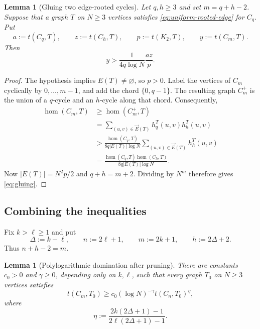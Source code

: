 \documentclass[11pt]{article}
\newtheorem{lemma}[theorem]{Lemma}
\theoremstyle{definition}
\theoremstyle{remark}
\newcommand{\homn}{\operatorname{hom}}
\begin{document}
\begin{lemma}[Gluing two edge-rooted cycles]
  \label{lem:gluing}
  Let $q,h\ge3$ and set $m=q+h-2$.  Suppose that a graph $T$ on
  $N\ge3$ vertices satisfies \eqref{eq:uniform-rooted-edge} for $C_q$.
  Put
  \[
    a:=t(C_q,T),
    \qquad
    z:=t(C_h,T),
    \qquad
    p:=t(K_2,T),
    \qquad
    y:=t(C_m,T).
  \]
  Then
  \begin{equation}
    y>\frac1{4q\log N}\frac{az}{p}.
    \label{eq:gluing}
  \end{equation}
\end{lemma}

\begin{proof}
  The hypothesis implies $E(T)\ne\varnothing$, so $p>0$.  Label the
  vertices of $C_m$ cyclically by $0,\ldots,m-1$, and add the chord
  $\{0,q-1\}$.  The resulting graph $C_m^+$ is the union of a $q$-cycle
  and an $h$-cycle along that chord.  Consequently,
  \[
  \begin{aligned}
    \homn(C_m,T)
    &\ge\homn(C_m^+,T)\\
    &=\sum_{(u,v)\in\vec E(T)}
      h_q^T(u,v)h_h^T(u,v)\\
    &>
    \frac{\homn(C_q,T)}
         {8q|E(T)|\log N}
    \sum_{(u,v)\in\vec E(T)}h_h^T(u,v)\\
    &=
    \frac{\homn(C_q,T)\homn(C_h,T)}
         {8q|E(T)|\log N}.
  \end{aligned}
  \]
  Now $|E(T)|=N^2p/2$ and $q+h=m+2$.  Dividing by $N^m$ therefore
  gives \eqref{eq:gluing}.
\end{proof}

\subsection{Combining the inequalities}

Fix $k>\ell\ge1$ and put
\[
  \Delta:=k-\ell,
  \qquad
  n:=2\ell+1,
  \qquad
  m:=2k+1,
  \qquad
  h:=2\Delta+2.
\]
Thus $n+h-2=m$.

\begin{lemma}[Polylogarithmic domination after pruning]
  \label{lem:polylog}
  There are constants $c_0>0$ and $\gamma\ge0$, depending only on
  $k,\ell$, such that every graph $T_0$ on $N\ge3$ vertices satisfies
  \begin{equation}
    t(C_m,T_0)
    \ge
    c_0(\log N)^{-\gamma}
    t(C_n,T_0)^\eta,
    \label{eq:polylog}
  \end{equation}
  where
  \begin{equation}
    \eta
    :=
    \frac{2k(2\Delta+1)-1}
         {2\ell(2\Delta+1)-1}.
    \label{eq:eta}
  \end{equation}
\end{lemma}
\end{document}
